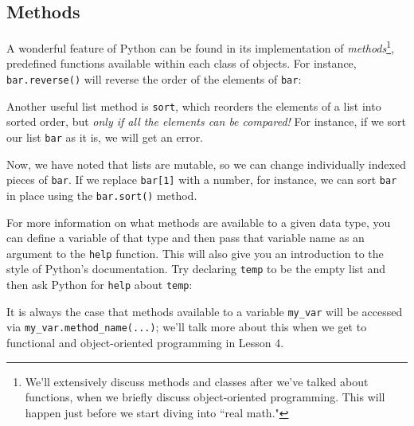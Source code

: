 \documentclass[m3380-lec-main.tex]{subfiles}
\begin{document}
\subsection{Methods} A wonderful feature of Python can be found in its implementation of \emph{methods}\footnote{We'll extensively discuss methods and classes after we've talked about functions, when we briefly discuss object-oriented programming. This will happen just before we start diving into ``real math."}, predefined functions available within each class of objects. For instance, \verb|bar.reverse()| will reverse the order of the elements of \verb|bar|:

\noindent
Another useful list method is \verb|sort|, which reorders the elements of a list into sorted order, but \emph{only if all the elements can be compared!} For instance, if we sort our list \verb|bar| as it is, we will get an error. 

\medskip\noindent

Now, we have noted that lists are mutable, so we can change individually indexed pieces of \verb|bar|. If we replace \verb|bar[1]| with a number, for instance, we can sort \verb|bar| in place using the \verb|bar.sort()| method.

\noindent

For more information on what methods are available to a given data type, you can define a variable of that type and then pass that variable name as an argument to the \verb|help| function. This will also give you an introduction to the style of Python's documentation. Try declaring \verb|temp| to be the empty list and then ask Python for \verb|help| about \verb|temp|:

\smallskip\noindent
It is always the case that methods available to a variable \verb|my_var| will be accessed via \verb|my_var.method_name(...)|; we'll talk more about this when we get to functional and object-oriented programming in Lesson 4.
\end{document}
